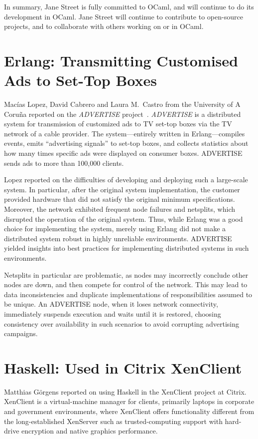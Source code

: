 \documentclass{jfp1}
\begin{document}
In summary, Jane Street is fully committed to OCaml, and will continue
to do its development in OCaml.  Jane Street will continue to
contribute to open-source projects, and to collaborate with others
working on or in OCaml.

\section{Erlang: Transmitting Customised Ads to Set-Top Boxes}

Macías Lopez, David Cabrero and Laura M.\ Castro from the University
of A Coruña reported on the \textit{ADVERTISE}
project~\cite{Lopez:2012:DDA:2370776.2370800,
  Lopez:2012:FTC:2364489.2364498}.  \textit{ADVERTISE} is a
distributed system for transmission of customized ads to TV set-top
boxes via the TV network of a cable provider.  The system---entirely
written in Erlang---compiles events, emits ``advertising signals'' to
set-top boxes, and collects statistics about how many times specific
ads were displayed on consumer boxes.  ADVERTISE sends ads to more
than 100,000 clients.

Lopez reported on the difficulties of developing and deploying such a
large-scale system.  In particular, after the original system
implementation, the customer provided hardware that did not
satisfy the original minimum specifications.  Moreover, the network
exhibited frequent node failures and netsplits, which disrupted the
operation of the original system.  Thus, while Erlang was a good
choice for implementing the system, merely using Erlang did not make
a distributed system robust in highly unreliable environments.
ADVERTISE yielded insights into best practices for implementing
distributed systems in such environments.

Netsplits in particular are problematic, as nodes may incorrectly
conclude other nodes are down, and then compete for control of the
network.  This may lead to data inconsistencies and duplicate
implementations of responsibilities assumed to be unique. An ADVERTISE
node, when it loses network connectivity, immediately suspends
execution and waits until it is restored, choosing consistency over
availability in such scenarios to avoid corrupting advertising
campaigns.

\section{Haskell: Used in Citrix XenClient}

Matthias Görgens reported on using Haskell in the XenClient project at
Citrix. XenClient is a virtual-machine manager for clients, primarily
laptops in corporate and government environments, where XenClient
offers functionality different from the long-established XenServer
such as trusted-computing support with hard-drive encryption and
native graphics performance.
\end{document}
